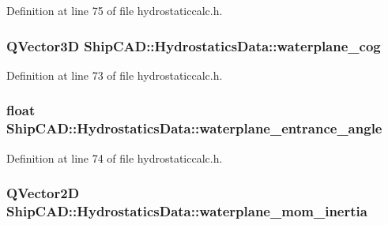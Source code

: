 Definition at line 75 of file hydrostaticcalc.\-h.

\hypertarget{structShipCAD_1_1HydrostaticsData_ac100876d13ae75147585c5c0f80801fe}{
\subsubsection[{waterplane\-\_\-cog}]{\setlength{\rightskip}{0pt plus 5cm}Q\-Vector3\-D Ship\-C\-A\-D\-::\-Hydrostatics\-Data\-::waterplane\-\_\-cog}}\label{structShipCAD_1_1HydrostaticsData_ac100876d13ae75147585c5c0f80801fe}


Definition at line 73 of file hydrostaticcalc.\-h.

\hypertarget{structShipCAD_1_1HydrostaticsData_a3e22cf4f03f02a3c0d14e7f66610fd80}{
\subsubsection[{waterplane\-\_\-entrance\-\_\-angle}]{\setlength{\rightskip}{0pt plus 5cm}float Ship\-C\-A\-D\-::\-Hydrostatics\-Data\-::waterplane\-\_\-entrance\-\_\-angle}}\label{structShipCAD_1_1HydrostaticsData_a3e22cf4f03f02a3c0d14e7f66610fd80}


Definition at line 74 of file hydrostaticcalc.\-h.

\hypertarget{structShipCAD_1_1HydrostaticsData_a2a662521564e9c0160c15acf9d3121f9}{
\subsubsection[{waterplane\-\_\-mom\-\_\-inertia}]{\setlength{\rightskip}{0pt plus 5cm}Q\-Vector2\-D Ship\-C\-A\-D\-::\-Hydrostatics\-Data\-::waterplane\-\_\-mom\-\_\-inertia}}\label{structShipCAD_1_1HydrostaticsData_a2a662521564e9c0160c15acf9d3121f9}


